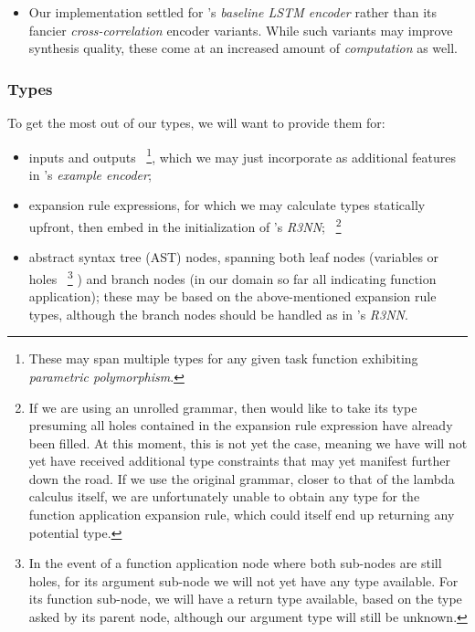 \documentclass{article}
\begin{document}
\begin{itemize}
    \item Our implementation settled for \citet{nsps}'s \emph{baseline LSTM encoder} rather than its fancier \emph{cross-correlation} encoder variants.
    While such variants may improve synthesis quality,
    these come at an increased amount of \emph{computation} as well.
\end{itemize}

\subsubsection{Types}


To get the most out of our types, we will want to provide them for:
\begin{itemize}
    \item inputs and outputs%
    ~\footnote{
        These may span multiple types for any given task function exhibiting \emph{parametric polymorphism}.
    },
    which we may just incorporate as additional features in \citet{nsps}'s \emph{example encoder};
    \item expansion rule expressions, for which we may calculate types statically upfront, then embed
    in the initialization of \citet{nsps}'s \emph{R3NN};%
    ~\footnote{
        If we are using an unrolled grammar,
        then would like to take its type presuming all holes contained in the expansion rule expression have already been filled.
        At this moment, this is not yet the case,
        meaning we have will not yet have received additional type constraints that may yet manifest further down the road.
        If we use the original grammar,
        closer to that of the lambda calculus itself,
        we are unfortunately unable to obtain any type for the function application expansion rule,
        which could itself end up returning any potential type.
    }
    \item abstract syntax tree (AST) nodes, spanning both leaf nodes (variables or holes%
    ~\footnote{
        In the event of a function application node where both sub-nodes are still holes,
        for its argument sub-node we will not yet have any type available.
        For its function sub-node, we will have a return type available,
        based on the type asked by its parent node,
        although our argument type will still be unknown.
    }
    ) and branch nodes (in our domain so far all indicating function application); these may be based on the above-mentioned expansion rule types, although the branch nodes should be handled as in \citet{nsps}'s \emph{R3NN}.
\end{itemize}
\end{document}
